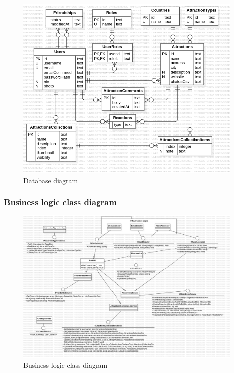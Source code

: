 \begin{figure}[!ht]
    \centering
    \includegraphics[width=0.7\linewidth]{db-diagram.png}
    \caption{Database diagram}
    \label{fig:enter-label}
\end{figure}


\subsubsection{Business logic class diagram}

\begin{figure}[!ht]
    \centering
    \includegraphics[width=1\linewidth]{business-class-diagram.png}
    \caption{Business logic class diagram}
    \label{fig:enter-label}
\end{figure}

